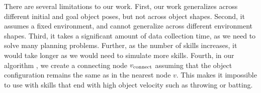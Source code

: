 
There are several limitations to our work. First, our work generalizes across different initial and goal object poses, but not across object shapes. Second, it assumes a fixed environment, and cannot generalize across different environment shapes. Third, it takes a significant amount of data collection time, as we need to solve many planning problems. Further, as the number of skills increases, it would take longer as we would need to simulate more skills. Fourth, in our algorithm \lazyskillrrt, we create a connecting node $v_{\text{connect}}$ assuming that the object configuration remains the same as in the nearest node $v$. This makes it impossible to use with skills that end with high object velocity such as throwing or batting.


